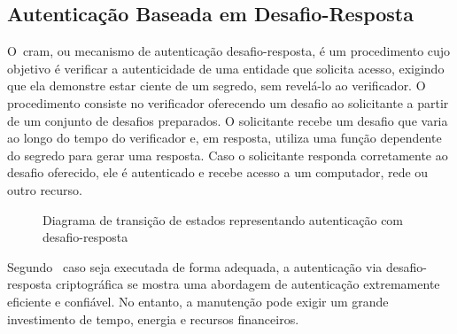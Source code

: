 \subsection{Autenticação Baseada em Desafio-Resposta}
\label{subsec:autenticacao-desafio-resposta}

O~\acrfull{cram}, ou mecanismo de autenticação desafio-resposta, é um
procedimento
cujo objetivo é verificar a autenticidade de uma entidade que solicita acesso,
exigindo que ela demonstre estar ciente de um segredo, sem revelá-lo ao
verificador.
O procedimento consiste no verificador oferecendo um desafio ao solicitante a
partir de um conjunto de desafios preparados.
O solicitante recebe um desafio que varia ao longo do tempo do verificador e,
em resposta, utiliza uma função dependente do segredo para gerar uma resposta.
Caso o solicitante responda corretamente ao desafio oferecido, ele é autenticado
e recebe acesso a um computador, rede ou outro recurso\cite{gilad2013}.

\begin{figure}[h!]
    \centering
    \caption[Diagrama representação autenticação via desafio-resposta]
    {Diagrama de transição de estados representando autenticação com
    desafio-resposta}
    \label{fig:diagrama-autenticacao-desafio-resposta}
\end{figure}

Segundo~\textcite{idrus2013} caso seja executada de forma adequada, a
autenticação
via desafio-resposta criptográfica se mostra uma abordagem de autenticação
extremamente
eficiente e confiável.
No entanto, a manutenção pode exigir um grande investimento de tempo, energia e
recursos financeiros.